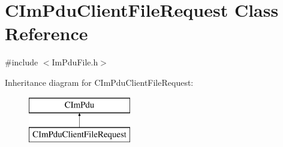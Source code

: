 \hypertarget{class_c_im_pdu_client_file_request}{}\section{C\+Im\+Pdu\+Client\+File\+Request Class Reference}
\label{class_c_im_pdu_client_file_request}


{\ttfamily \#include $<$Im\+Pdu\+File.\+h$>$}

Inheritance diagram for C\+Im\+Pdu\+Client\+File\+Request\+:\begin{figure}[H]
\begin{center}
\leavevmode
\includegraphics[height=2.000000cm]{class_c_im_pdu_client_file_request}
\end{center}
\end{figure}
